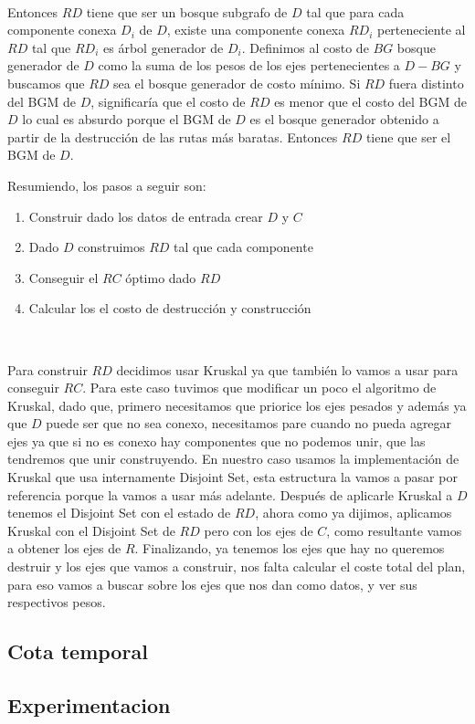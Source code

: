 \\
\par
Entonces $RD$ tiene que ser un bosque subgrafo de $D$ tal que para cada componente conexa $D_i$ de $D$, existe una componente conexa $RD_i$ perteneciente al $RD$ tal que $RD_i$ es árbol generador de $D_i$. Definimos al costo de $BG$ bosque generador de $D$  como la suma de los pesos de los ejes pertenecientes a $D - BG$ y buscamos que $RD$ sea el bosque generador de costo mínimo. Si $RD$ fuera distinto del BGM de $D$, significaría que el costo de $RD$ es menor que el costo del BGM de $D$ lo cual es absurdo porque el BGM de $D$ es el bosque generador obtenido a partir de la destrucción de las rutas más baratas. Entonces $RD$ tiene que ser el BGM de $D$.
\\
\par
Resumiendo, los pasos a seguir son:
\begin{enumerate}
\item Construir dado los datos de entrada crear $D$ y $C$
\item Dado $D$ construimos $RD$ tal que cada componente
\item Conseguir el $RC$ óptimo dado $RD$
\item Calcular los el costo de destrucción y construcción
\end{enumerate}
\\
\par 
Para construir $RD$ decidimos usar Kruskal ya que también lo vamos a usar para conseguir $RC$. Para este caso tuvimos que modificar un poco el algoritmo de Kruskal, dado que, primero necesitamos que priorice los ejes pesados y además ya que $D$ puede ser que no sea conexo, necesitamos pare cuando no pueda agregar ejes ya que si no es conexo hay componentes que no podemos unir, que las tendremos que unir construyendo. En nuestro caso usamos la implementación de Kruskal que usa internamente Disjoint Set, esta estructura la vamos a pasar por referencia porque la vamos a usar más adelante.
Después de aplicarle Kruskal a $D$ tenemos el Disjoint Set con el estado de $RD$, ahora como ya dijimos, aplicamos Kruskal con el Disjoint Set de $RD$ pero con los ejes de $C$, como resultante vamos a obtener los ejes de $R$. Finalizando, ya tenemos los ejes que hay no queremos destruir y los ejes que vamos a construir, nos falta calcular el coste total del plan, para eso vamos a buscar sobre los ejes que nos dan como datos, y ver sus respectivos pesos.


\subsection{Cota temporal}

\subsection{Experimentacion}

\pagebreak